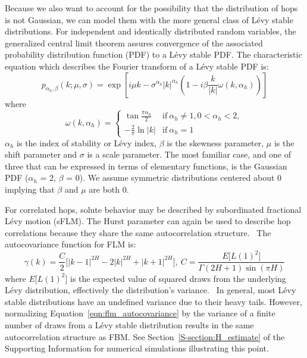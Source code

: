 \documentclass[journal=jctcce,manuscript=article]{achemso}
\begin{document}
  Because we also want to account for the possibility that the distribution of
  hops is not Gaussian, we can model them with the more general class of L\'evy
  stable distributions. For independent and identically distributed random
  variables, the generalized central limit theorem assures convergence of the
  associated probability distribution function (PDF) to a L\'evy stable PDF.
  \cite{klages_anomalous_2008} The characteristic equation which describes the
  Fourier transform of a L\'evy stable PDF is: 
  \begin{equation}
    p_{\alpha_h, \beta}(k;\mu,\sigma) =\exp\left[i\mu k - \sigma^{\alpha_h}|k|^{\alpha_h}\left(1 - i\beta\frac{k}{|k|}\omega(k, \alpha_h)\right)\right]
  \end{equation}
  where \\
  \[\omega(k, \alpha_h) = \begin{cases}
  	\tan{\frac{\pi \alpha_h}{2}} & \text{if}~\alpha_h \neq 1, 0 < \alpha_h < 2, \\
  	-\frac{2}{\pi}\ln |k| & \text{if}~\alpha_h = 1
  	 \end{cases}
  \]
  $\alpha_h$ is the index of stability or L\'evy index, $\beta$ is the skewness 
  parameter, $\mu$ is the shift parameter and $\sigma$ is a scale parameter. The most
  familiar case, and one of three that can be expressed in terms of elementary functions,
  is the Gaussian PDF ($\alpha_h$ = 2, $\beta$ = 0). We assume symmetric distributions
  centered about 0 implying that $\beta$ and $\mu$ are both 0.
  
  For correlated hops, solute behavior may be described by subordinated
  fractional L\'evy motion (sFLM). The Hurst parameter can again be used to
  describe hop correlations because they share the same autocorrelation
  structure.~\cite{tikanmaki_fractional_2010} The autocovariance function for
  FLM is:
  \begin{equation}
    \gamma(k) = \dfrac{C}{2}\bigg[|k-1|^{2H} - 2|k|^{2H} + |k+1|^{2H}\bigg],
    ~C = \frac{E\big[L(1)^2\big]}{\Gamma(2H + 1)\sin(\pi H)}
    \label{eqn:flm_autocovariance}
  \end{equation}
  where $E\big[L(1)^2\big]$ is the expected value of squared draws from the 
  underlying L\'evy distribution, effectively the distribution's 
  variance.~\cite{bishwal_maximum_2011} In general, most L\'evy stable distributions
  have an undefined variance due to their heavy tails. However, normalizing
  Equation~\ref{eqn:flm_autocovariance} by the variance of a finite number of draws
  from a L\'evy stable distribution results in the same autocorrelation structure as FBM.
  See Section~\ref{S-section:H_estimate} of the Supporting Information for numerical
  simulations illustrating this point.
  
\end{document}
